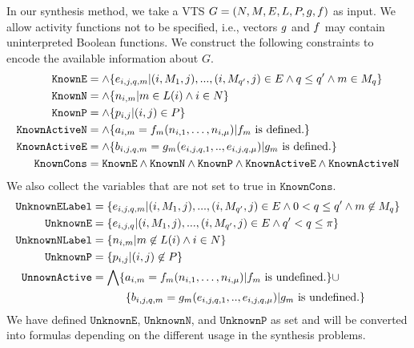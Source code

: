 In our synthesis method, we take a VTS $G =
(N,M,E,L,P,g,f)$ as input.
%
We allow activity functions not to be specified, i.e., vectors
$g$ and $f$ may contain uninterpreted Boolean functions.
%
We construct the following constraints to encode the available information
about $G$.
%
\begin{align*}
  \texttt{KnownE} &= \land \{e_{i,j,q,m}|(i,M_1,j),...,(i,M_{q'},j) \in E \land q \leq q' \land m \in M_q \}\\
  \texttt{KnownN} &= \land \{n_{i,m}| m \in L(i) \land i \in N \}\\
  \texttt{KnownP} &= \land \{p_{i,j}| (i,j) \in P \} \\
  \texttt{KnownActiveN} &= \land \{ a_{i,m} = f_m (n_{i,1},\dots,n_{i,\mu}) | f_m \text{ is defined.} \} \\
  \texttt{KnownActiveE} &= \land \{ b_{i,j,q,m} = g_m(e_{i,j,q,1}, .., e_{i,j,q,\mu})
                   | g_m \text{ is defined.} \} \\
  \texttt{KnownCons} & = \texttt{KnownE} \land \texttt{KnownN} \land 
 \texttt{KnownP} \land \texttt{KnownActiveE} \land \texttt{KnownActiveN}
\end{align*}
We also collect the variables that are not set to true in $\texttt{KnownCons}$.
\begin{align*}
  \texttt{UnknownELabel} &=
  \{e_{i,j,q,m}|(i,M_1,j),...,(i,M_{q'},j) \in E \land 
                          0 < q \leq q' \land m \not\in M_{q} \}\\
  \texttt{UnknownE} &= \{e_{i,j,q}|(i,M_1,j),...,(i,M_{q'},j) \in E \land 
                    q' < q \leq \pi \}\\
  \texttt{UnknownNLabel} &= \{n_{i,m}| m \not\in L(i) \land i \in N \}\\
  \texttt{UnknownP} &= \{p_{i,j}| (i,j) \not\in P \} \\
  \texttt{UnnownActive} &=  \bigwedge \{ a_{i,m} = f_m (n_{i,1},\dots,n_{i,\mu}) | f_m \text{ is undefined.} \} {\cup} \\
   &\quad\quad\quad  \{ b_{i,j,q,m} = g_m(e_{i,j,q,1}, .., e_{i,j,q,\mu})
                   | g_m \text{ is undefined.} \}
\end{align*}
We have defined $\texttt{UnknownE}$, $\texttt{UnknownN}$, and
$\texttt{UnknownP}$
as set and will be converted into formulas depending
on the different usage in the synthesis problems. 


